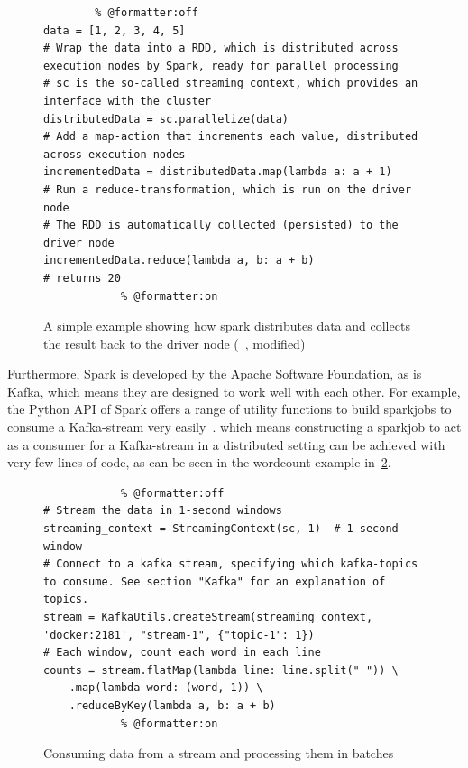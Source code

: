 \begin{figure}
    \caption{A simple example showing how spark distributes data and collects the result back to the driver node (~\cite{sparkDocs}, modified)}
    \label{code:simpleParallelization}
    \begin{verbatim}
        % @formatter:off
data = [1, 2, 3, 4, 5]
# Wrap the data into a RDD, which is distributed across execution nodes by Spark, ready for parallel processing
# sc is the so-called streaming context, which provides an interface with the cluster
distributedData = sc.parallelize(data)
# Add a map-action that increments each value, distributed across execution nodes
incrementedData = distributedData.map(lambda a: a + 1)
# Run a reduce-transformation, which is run on the driver node
# The RDD is automatically collected (persisted) to the driver node
incrementedData.reduce(lambda a, b: a + b)
# returns 20
            % @formatter:on
    \end{verbatim}
\end{figure}

Furthermore, Spark is developed by the Apache Software Foundation, as is Kafka,
which means they are designed to work well with each other.
For example, the Python API of Spark offers a range of utility functions to build sparkjobs to consume a Kafka-stream very easily~\cite{sparkDocs}.
which means constructing a sparkjob to act as a consumer for a Kafka-stream in a distributed setting can be achieved with very few lines of code,
as can be seen in the wordcount-example in~\ref{code:wordcount}.

\begin{figure}
    \caption{Consuming data from a stream and processing them in batches}
    \label{code:wordcount}
        \begin{verbatim}
            % @formatter:off
# Stream the data in 1-second windows
streaming_context = StreamingContext(sc, 1)  # 1 second window
# Connect to a kafka stream, specifying which kafka-topics to consume. See section "Kafka" for an explanation of topics.
stream = KafkaUtils.createStream(streaming_context, 'docker:2181', "stream-1", {"topic-1": 1})
# Each window, count each word in each line
counts = stream.flatMap(lambda line: line.split(" ")) \
    .map(lambda word: (word, 1)) \
    .reduceByKey(lambda a, b: a + b)
            % @formatter:on
        \end{verbatim}
\end{figure}


